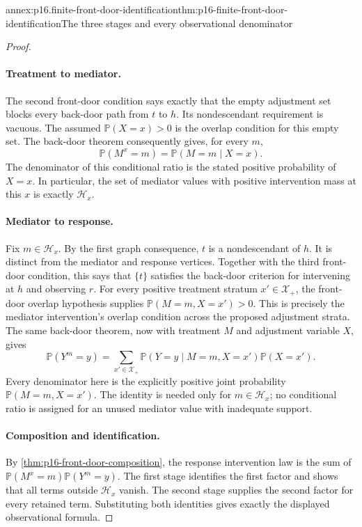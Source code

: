 \begin{annexitem}{annex:p16.finite-front-door-identification}{thm:p16-finite-front-door-identification}{The three stages and every observational denominator}
\begin{proof}
\paragraph{Treatment to mediator.}
The second front-door condition says exactly that the empty adjustment
set blocks every back-door path from \(t\) to \(h\). Its
nondescendant requirement is vacuous. The assumed
\(\mathbb P(X=x)>0\) is the overlap condition for this empty
set. The back-door theorem consequently gives, for every \(m\),
\[
 \mathbb P(M^x=m)=\mathbb P(M=m\mid X=x).
\]
The denominator of this conditional ratio is the stated positive
probability of \(X=x\). In particular, the set of mediator values
with positive intervention mass at this \(x\) is exactly
\(\mathcal H_x\).

\paragraph{Mediator to response.}
Fix \(m\in\mathcal H_x\). By the first graph consequence,
\(t\) is a nondescendant of \(h\). It is distinct from the
mediator and response vertices. Together with the third front-door
condition, this says that \(\{t\}\) satisfies the back-door
criterion for intervening at \(h\) and observing \(r\).
For every positive treatment stratum \(x'\in\mathcal X_+\),
the front-door overlap hypothesis supplies
\(\mathbb P(M=m,X=x')>0\). This is precisely the mediator
intervention's overlap condition across the proposed adjustment strata.
The same back-door theorem, now with treatment \(M\) and adjustment
variable \(X\), gives
\[
 \mathbb P(Y^m=y)
   =\sum_{x'\in\mathcal X_+}
      \mathbb P(Y=y\mid M=m,X=x')\mathbb P(X=x').
\]
Every denominator here is the explicitly positive joint probability
\(\mathbb P(M=m,X=x')\). The identity is needed only for
\(m\in\mathcal H_x\); no conditional ratio is assigned for
an unused mediator value with inadequate support.

\paragraph{Composition and identification.}
By \cref{thm:p16-front-door-composition}, the response intervention
law is the sum of \(\mathbb P(M^x=m)\mathbb P(Y^m=y)\).
The first stage identifies the first factor and shows that all terms
outside \(\mathcal H_x\) vanish. The second stage supplies the
second factor for every retained term. Substituting both identities
gives exactly the displayed observational formula.


\end{proof}
\end{annexitem}
